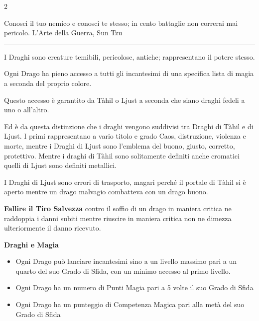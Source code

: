 \begin{multicols}{2}
{\medskip


\begin{enfasi}
Conosci il tuo nemico e conosci te stesso; in cento battaglie non correrai mai pericolo. L'Arte della Guerra, Sun Tzu
\end{enfasi}

\rule{\linewidth}{2pt}

\medskip




I Draghi sono creature temibili, pericolose, antiche; rappresentano il potere stesso.

Ogni Drago ha pieno accesso a tutti gli incantesimi di una specifica lista di magia a seconda del proprio colore.

Questo accesso è garantito da Tàhil o Ljust a seconda che siano draghi fedeli a uno o all'altro.

Ed è da questa distinzione che i draghi vengono suddivisi tra Draghi di Tàhil e di Ljust. I primi rappresentano a vario titolo e grado Caos, distruzione, violenza e morte, mentre i Draghi di Ljust sono l'emblema del buono, giusto, corretto, protettivo. Mentre i draghi di Tàhil sono solitamente definiti anche cromatici quelli di Ljust sono definiti metallici.

I Draghi di Ljust sono errori di trasporto, magari perché il portale di Tàhil si è aperto mentre un drago malvagio combatteva con un drago buono.

\textbf{Fallire il Tiro Salvezza} contro il soffio di un drago in maniera critica ne raddoppia i danni subiti mentre riuscire in maniera critica non ne dimezza ulteriormente il danno ricevuto.

\medskip

\textbf{Draghi e Magia}

\begin{itemize}[leftmargin=*] \setlength{\itemsep}{0pt}
\item Ogni Drago può lanciare incantesimi sino a un livello massimo pari a un quarto del suo Grado di Sfida, con un minimo accesso al primo livello.
\item Ogni Drago ha un numero di Punti Magia pari a 5 volte il suo Grado di Sfida
\item Ogni Drago ha un punteggio di Competenza Magica pari alla metà del suo Grado di Sfida
\end{itemize}

\medskip

}
\end{multicols}

